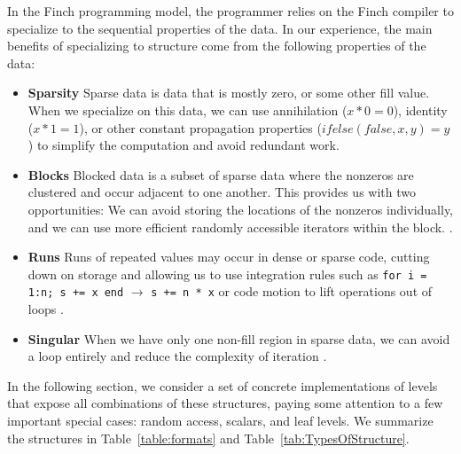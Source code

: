     In the Finch programming model, the programmer relies on the Finch compiler to specialize to the sequential properties of the data. In our experience, the main benefits of specializing to structure come from the following properties of the data:

    \begin{itemize}
        \item \textbf{Sparsity} Sparse data is data that is mostly zero, or some other
        fill value. When we specialize on this data, we can use annihilation ($x
        * 0 = 0$), identity ($x * 1 = 1$), or other constant propagation
        properties ($ifelse(false, x, y) = y$) to simplify the computation and avoid
        redundant work.
        
        \item \textbf{Blocks} Blocked data is a subset of sparse data where the nonzeros
        are clustered and occur adjacent to one another. This provides us with
        two opportunities: We can avoid storing the locations of the nonzeros
        individually, and we can use more efficient randomly accessible
        iterators within the block. \cite{im_optimizing_2001, vuduc_performance_2002, ahrens_looplets_2023}.

        \item \textbf{Runs} Runs of repeated values may occur in dense or sparse code,
        cutting down on storage and allowing us to use integration rules such as 
        \texttt{for i = 1:n; s += x end} $\rightarrow$
        \texttt{s += n * x} or code motion to lift operations out of loops \cite{donenfeld_unified_2022,ahrens_looplets_2023}.

        \item \textbf{Singular} When we have only one non-fill region in sparse data,
        we can avoid a loop entirely and reduce the complexity of iteration \cite{ghorbani2023compiling, ahrens_looplets_2023}.
    \end{itemize}
    In the following section, we consider a set of concrete implementations of levels that expose all combinations of these structures, paying some attention to a few important special cases: random access, scalars, and leaf levels. We summarize the structures in Table~\ref{table:formats} and Table~\ref{tab:TypesOfStructure}.
    
